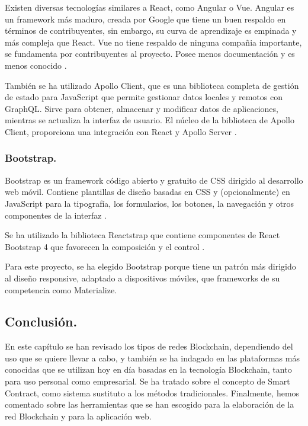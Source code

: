 \vspace{5mm}

\noindent Existen diversas tecnologías similares a React, como Angular o Vue. Angular es un framework más maduro, 
creada por Google que tiene un buen respaldo en términos de contribuyentes, sin embargo, su curva de aprendizaje es 
empinada y más compleja que React. Vue no tiene respaldo de ninguna compañia importante, se fundamenta por 
contribuyentes al proyecto. Posee menos documentación y es menos conocido \cite{angular-react-vue}. 

\vspace{5mm}

\noindent También se ha utilizado Apollo Client, que es una biblioteca completa de gestión de estado para JavaScript 
que permite gestionar datos locales y remotos con GraphQL. Sirve para obtener, almacenar y modificar datos de 
aplicaciones, mientras se actualiza la interfaz de usuario. El núcleo de la biblioteca de Apollo Client, proporciona 
una integración con React y Apollo Server \cite{introduction-apollo-client}.

\subsubsection*{Bootstrap.}

Bootstrap es un framework código abierto y gratuito de CSS dirigido al desarrollo web móvil. Contiene plantillas 
de diseño basadas en CSS y (opcionalmente) en JavaScript para la tipografía, los formularios, los botones, la 
navegación y otros componentes de la interfaz \cite{bootstrap}.

\vspace{5mm}

\noindent Se ha utilizado la biblioteca Reactstrap que contiene componentes de React Bootstrap 4 que favorecen la 
composición y el control \cite{reactstrap}.

\vspace{5mm}

\noindent Para este proyecto, se ha elegido Bootstrap porque tiene un patrón más dirigido al diseño responsive, 
adaptado a dispositivos móviles, que frameworks de su competencia como Materialize.

\subsection{Conclusión.}

En este capítulo se han revisado los tipos de redes Blockchain, dependiendo del uso que se quiere llevar a cabo, y 
también se ha indagado en las plataformas más conocidas que se utilizan hoy en día basadas en la tecnología Blockchain, 
tanto para uso personal como empresarial. Se ha tratado sobre el concepto de Smart Contract, como sistema sustituto a 
los métodos tradicionales. Finalmente, hemos comentado sobre las herramientas que se han escogido para la elaboración 
de la red Blockchain y para la aplicación web.

\newpage